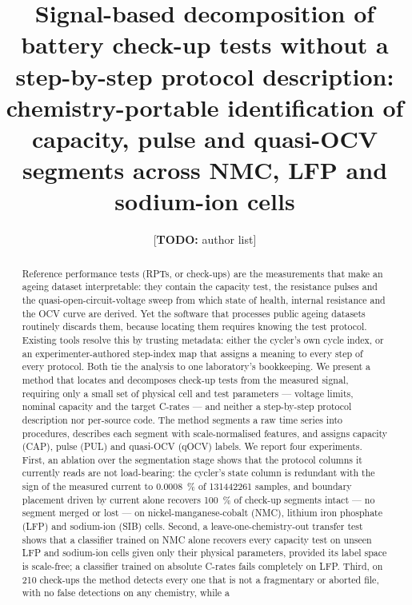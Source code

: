 \documentclass[preprint,3p,number]{elsarticle}
\newif\ifdraft\drafttrue
\newcommand{\todo}[1]{\ifdraft\textcolor{red!60!black}{[\textbf{TODO:} #1]}\fi}
\begin{document}
\begin{frontmatter}

\title{Signal-based decomposition of battery check-up tests without a
step-by-step protocol description: chemistry-portable identification of
capacity, pulse and quasi-OCV segments across NMC, LFP and sodium-ion cells}

\author[isea]{\todo{author list}}
\address[isea]{\todo{affiliation}}

\begin{abstract}
Reference performance tests (RPTs, or check-ups) are the measurements that make
an ageing dataset interpretable: they contain the capacity test, the resistance
pulses and the quasi-open-circuit-voltage sweep from which state of health,
internal resistance and the OCV curve are derived. Yet the software that
processes public ageing datasets routinely discards them, because locating them
requires knowing the test protocol. Existing tools resolve this by trusting
metadata: either the cycler's own cycle index, or an experimenter-authored
step-index map that assigns a meaning to every step of every protocol. Both tie
the analysis to one laboratory's bookkeeping.
%
We present a method that locates and decomposes check-up tests from the
measured signal, requiring only a small set of physical cell and test
parameters --- voltage limits, nominal capacity and the target C-rates --- and
neither a step-by-step protocol description nor per-source code. The method
segments a raw time series into procedures, describes each segment with
scale-normalised features, and assigns capacity (CAP), pulse (PUL) and
quasi-OCV (qOCV) labels.
%
We report four experiments. First, an ablation over the segmentation stage shows
that the protocol columns it currently reads are not load-bearing: the cycler's
state column is redundant with the sign of the measured current to
\SI{0.0008}{\percent} of \num{131442261} samples, and boundary placement driven
by current alone recovers \SI{100}{\percent} of check-up segments intact --- no
segment merged or lost --- on nickel-manganese-cobalt (NMC), lithium iron
phosphate (LFP) and sodium-ion (SIB) cells. Second, a leave-one-chemistry-out
transfer test shows that a classifier trained on NMC alone recovers every
capacity test on unseen LFP and sodium-ion cells given only their physical
parameters, provided its label space is scale-free; a classifier trained on
absolute C-rates fails completely on LFP.
%
Third, on \num{210} check-ups the method detects every one that is not a
fragmentary or aborted file, with no false detections on any chemistry, while a

\end{abstract}
\end{frontmatter}
\end{document}
